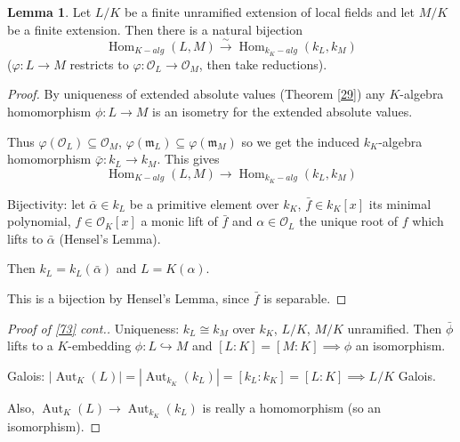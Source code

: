\documentclass[a4paper]{article}
\theoremstyle{definition}
\theoremstyle{default}
\newtheorem{lemma}[definition]{Lemma}
\theoremstyle{remark}
\newcommand*\abs[1]{\left|#1\right|}
\DeclareMathOperator{\Aut}{Aut}
\DeclareMathOperator{\Hom}{Hom}
\begin{document}
\begin{lemma}
	Let $L/K$ be a finite unramified extension of local fields and let $M/K$ be a finite extension.
	Then there is a natural bijection
	$$\Hom_{K-alg}(L,M) \overset{\sim}{\to} \Hom_{k_K-alg}(k_L, k_M)$$
	($\varphi:L\to M$ restricts to $\varphi: \mathcal{O}_L \to \mathcal{O}_M$, then take reductions).
	\label{74}
\end{lemma}
\begin{proof}
	By uniqueness of extended absolute values (Theorem \ref{29})
	any $K$-algebra homomorphism $\phi: L \to M$ is an isometry for the extended absolute values.
	
	Thus $\varphi(\mathcal{O}_L) \subseteq \mathcal{O}_M$, $\varphi(\mathfrak{m}_L) \subseteq \varphi(\mathfrak{m}_M)$
	so we get the induced $k_K$-algebra homomorphism $\bar{\varphi}: k_L \to k_M$.
	This gives
	$$\Hom_{K-alg}(L,M) \to \Hom_{k_K-alg}(k_L, k_M)$$
	
	Bijectivity: let $\bar{\alpha} \in k_L$ be a primitive element over $k_K$,
	$\bar{f} \in k_K[x]$ its minimal polynomial,
	$f \in \mathcal{O}_K[x]$ a monic lift of $\bar{f}$ and $\alpha \in \mathcal{O}_L$ the unique root of $f$ which lifts to $\bar{\alpha}$ (Hensel's Lemma).
	
	Then $k_L = k_L(\bar{\alpha})$ and $L=K(\alpha)$.
	
	\begin{center}
	\end{center}
	This is a bijection by Hensel's Lemma,
	since $\bar{f}$ is separable.
\end{proof}

\begin{proof}[Proof of \ref{73} cont.]
	Uniqueness: $k_L \cong k_M$ over $k_K$, $L/K$, $M/K$ unramified.
	Then $\bar{\phi}$ lifts to a $K$-embedding $\phi: L \hookrightarrow M$ and $[L:K]=[M:K] \implies \phi$ an isomorphism.
	
	Galois: $\abs{\Aut_K(L)} = \abs{\Aut_{k_K}(k_L)} = [k_L: k_K] = [L:K] \implies L/K$ Galois.
	
	Also, $\Aut_K(L) \to \Aut_{k_K}(k_L)$ is really a homomorphism (so an isomorphism).
\end{proof}
\end{document}
